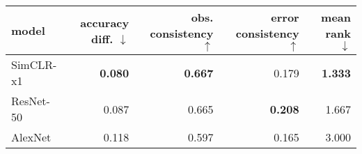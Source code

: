 \begin{tabular}{lrrrr}
\toprule
     model & accuracy diff. $\downarrow$ & obs. consistency $\uparrow$ & error consistency $\uparrow$ & mean rank $\downarrow$ \\
\midrule
 SimCLR-x1 &              \textbf{0.080} &              \textbf{0.667} &                        0.179 &         \textbf{1.333} \\
 ResNet-50 &                       0.087 &                       0.665 &               \textbf{0.208} &                  1.667 \\
   AlexNet &                       0.118 &                       0.597 &                        0.165 &                  3.000 \\
\bottomrule
\end{tabular}

